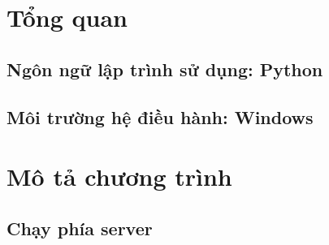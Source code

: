 \section{Tổng quan}
\subsection{Ngôn ngữ lập trình sử dụng: Python}
\subsection{Môi trường hệ điều hành: Windows}

\section{Mô tả chương trình}
\subsection{Chạy phía server}
